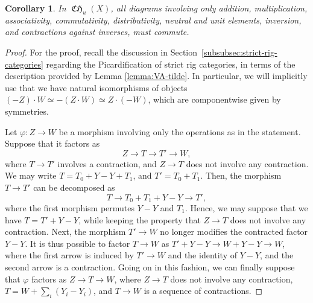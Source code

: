 \documentclass[11pt]{article}
\theoremstyle{plain}
\newtheorem{corollary}[theorem]{Corollary}
\theoremstyle{definition}
\DeclareMathOperator{\CHfrak}{\mathfrak{CH}}
\begin{document}
\begin{corollary}\label{cor:coherence}
In $\CHfrak_{u}(X)$, all diagrams involving only addition, multiplication, associativity, commutativity, distributivity, neutral and unit elements, inversion, and contractions against inverses, must commute.
\end{corollary}
\begin{proof}

For the proof, recall the discussion in Section~\ref{subsubsec:strict-rig-categories} regarding the Picardification of strict rig categories, in terms of the description provided by Lemma \ref{lemma:VA-tilde}. In particular, we will implicitly use that we have natural isomorphisms of objects $(-Z)\cdot W\simeq -(Z\cdot W)\simeq Z\cdot (-W)$, which are componentwise given by symmetries.

Let $\varphi\colon Z\to W$ be a morphism involving only the operations as in the statement. Suppose that it factors as
\begin{displaymath}
Z\to T\to T'\to W,
\end{displaymath}
where $T\to T'$ involves a contraction, and $Z\to T$ does not involve any contraction. We may write $T=T_{0}+Y-Y+T_{1}$, and $T'=T_{0}+T_{1}$. Then, the morphism $T\to T'$ can be decomposed as
\begin{displaymath}
T\to T_{0}+T_{1}+Y-Y\to T',
\end{displaymath}
where the first morphism permutes $Y-Y$ and $T_{1}$. Hence, we may suppose that we have $T=T'+Y-Y$, while keeping the property that $Z\to T$ does not involve any contraction. Next, the morphism $T'\to W$ no longer modifies the contracted factor $Y-Y$. It is thus possible to factor $T\to W$ as $T'+Y-Y\to W+Y-Y\to W$, where the first arrow is induced by $T'\to W$ and the identity of $Y-Y$, and the second arrow is a contraction. Going on in this fashion, we can finally suppose that $\varphi$ factors as $Z\to T\to W$, where $Z\to T$ does not involve any contraction, $T=W+\sum_{i}(Y_{i}-Y_{i})$, and $T\to W$ is a sequence of contractions.


\end{proof}
\end{document}
